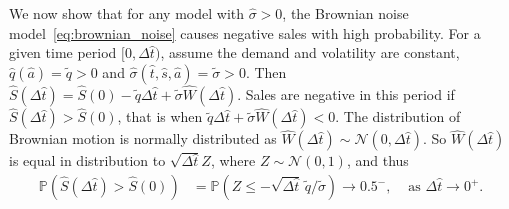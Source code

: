 \documentclass[main.tex]{subfiles}
\begin{document}
We now show that for any model with $\hat{\sigma}>0$, the Brownian noise
model~\eqref{eq:brownian_noise} causes negative sales with high
probability.
For a given time period $[0,\Delta{\hat{t}})$, assume the demand and volatility are constant,
$\hat{q}(\hat{a})=\tilde q>0$ and $\hat{\sigma}(\hat{t},\hat{s},\hat{a})=\tilde \sigma>0$.
Then $\hat{S}(\Delta{\hat{t}})=\hat{S}(0)-\tilde q\Delta{\hat{t}} + \tilde{\sigma} \hat{W}(\Delta{\hat{t}})$.
Sales are negative in this period if $\hat{S}(\Delta{\hat{t}})>\hat{S}(0)$, that is when
$\tilde{q}\Delta{\hat{t}}+\tilde{\sigma} \hat{W}(\Delta{\hat{t}}) < 0$.
The distribution of Brownian motion is normally distributed as
$\hat{W}(\Delta{\hat{t}})\sim \mathcal{N}(0,\Delta{\hat{t}})$. So $\hat{W}(\Delta{\hat{t}})$ is equal in
distribution to $\sqrt{\Delta{\hat{t}}}Z$, where $Z\sim \mathcal{N}(0,1)$, and thus
\begin{align}
  \mathbb{P}(\hat{S}(\Delta{\hat{t}})>\hat{S}(0))
  &=\mathbb{P}(Z\leq -\sqrt{\Delta{\hat{t}}}\,\tilde q / \tilde \sigma)
    \to 0.5^-,& \text{ as } \Delta{\hat{t}} \to 0^+.
\end{align}
\end{document}
